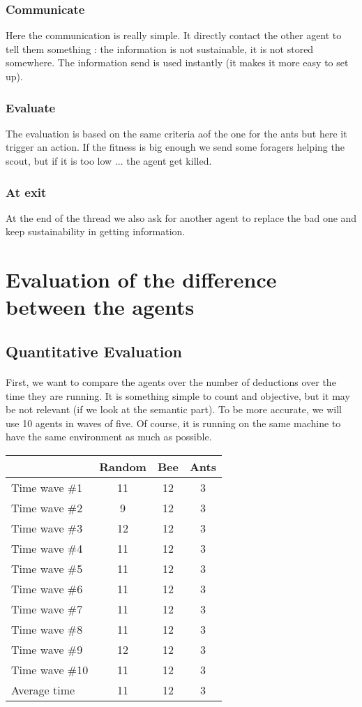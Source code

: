 \documentclass{article}
\begin{document}
		\subsubsection{Communicate}
			Here the communication is really simple.
			It directly contact the other agent to tell them something : the information is not sustainable, it is not stored somewhere.
			The information send is used instantly (it makes it more easy to set up).
		\subsubsection{Evaluate}
			The evaluation is based on the same criteria aof the one for the ants but here it trigger an action.
			If the fitness is big enough we send some foragers helping the scout, but if it is too low ... the agent get killed.
		\subsubsection{At exit}
			At the end of the thread we also ask for another agent to replace the bad one and keep sustainability in getting information.
			
\section{Evaluation of the difference between the agents}
	\subsection{Quantitative Evaluation}
		\paragraph{}
			First, we want to compare the agents over the number of deductions over the time they are running.
			It is something simple to count and objective, but it may be not relevant (if we look at the semantic part).
			To be more accurate, we will use 10 agents in waves of five.	%
			Of course, it is running on the same machine to have the same environment as much as possible.
		\begin{center}
			\begin{tabular}{|l|c|c|c|}
				\hline
				& Random & Bee & Ants\\
				\hline
				Time wave \#1 & 11 & 12 & 3 \\
				Time wave \#2 & 9  & 12 & 3 \\
				Time wave \#3 & 12 & 12 & 3 \\
				Time wave \#4 & 11 & 12 & 3 \\
				Time wave \#5 & 11 & 12 & 3 \\
				Time wave \#6 & 11 & 12 & 3 \\
				Time wave \#7 & 11 & 12 & 3 \\
				Time wave \#8 & 11 & 12 & 3 \\
				Time wave \#9 & 12 & 12 & 3 \\
				Time wave \#10& 11 & 12 & 3 \\
				\hline
				Average time  & 11 & 12 & 3 \\
				\hline
			\end{tabular}
		\end{center}
\end{document}
